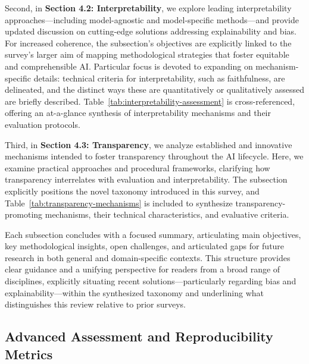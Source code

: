 \documentclass[sigconf]{acmart}
\begin{document}
Second, in \textbf{Section 4.2: Interpretability}, we explore leading interpretability approaches—including model-agnostic and model-specific methods—and provide updated discussion on cutting-edge solutions addressing explainability and bias. For increased coherence, the subsection’s objectives are explicitly linked to the survey's larger aim of mapping methodological strategies that foster equitable and comprehensible AI. Particular focus is devoted to expanding on mechanism-specific details: technical criteria for interpretability, such as faithfulness, are delineated, and the distinct ways these are quantitatively or qualitatively assessed are briefly described. Table~\ref{tab:interpretability-assessment} is cross-referenced, offering an at-a-glance synthesis of interpretability mechanisms and their evaluation protocols.

Third, in \textbf{Section 4.3: Transparency}, we analyze established and innovative mechanisms intended to foster transparency throughout the AI lifecycle. Here, we examine practical approaches and procedural frameworks, clarifying how transparency interrelates with evaluation and interpretability. The subsection explicitly positions the novel taxonomy introduced in this survey, and Table~\ref{tab:transparency-mechanisms} is included to synthesize transparency-promoting mechanisms, their technical characteristics, and evaluative criteria.

Each subsection concludes with a focused summary, articulating main objectives, key methodological insights, open challenges, and articulated gaps for future research in both general and domain-specific contexts. This structure provides clear guidance and a unifying perspective for readers from a broad range of disciplines, explicitly situating recent solutions—particularly regarding bias and explainability—within the synthesized taxonomy and underlining what distinguishes this review relative to prior surveys.


\subsection{Advanced Assessment and Reproducibility Metrics}
\end{document}
